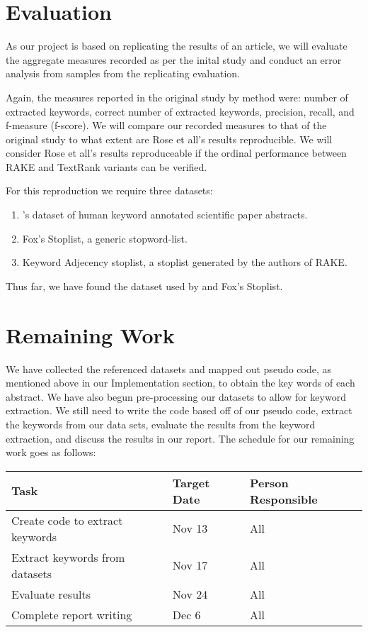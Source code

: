 \documentclass[11pt,a4paper]{article}
\begin{document}
\section{Evaluation}

As our project is based on replicating the results of an article, we will evaluate the aggregate measures recorded as per the inital study and conduct an error analysis from samples from the replicating evaluation. 

Again, the measures reported in the original study by method were: number of extracted keywords, correct number of extracted keywords, precision, recall, and f-measure (f-score).  We will compare our recorded measures to that of the original study to what extent are Rose et all's results reproducible. We will consider Rose et all's results reproduceable if the ordinal performance between RAKE and TextRank variants can be verified. 

For this reproduction we require three datasets:

\begin{enumerate}
\item \citet{hulth-2003-improved}'s dataset of human keyword annotated scientific paper abstracts.
\item Fox's Stoplist, a generic stopword-list. 
\item Keyword Adjecency stoplist, a stoplist generated by the authors of RAKE.
\end{enumerate}   

Thus far, we have found the dataset used by \citet{hulth-2003-improved} and Fox's Stoplist.

\section{Remaining Work}

We have collected the referenced datasets and mapped out pseudo code, as mentioned above in our Implementation section, to obtain the key words of each abstract. We have also begun pre-processing our datasets to allow for keyword extraction. We still need to write the code based off of our pseudo code, extract the keywords from our data sets, evaluate the results from the keyword extraction, and discuss the results in our report. The schedule for our remaining work goes as follows:

\begin{table}[h]
\begin{center}
\begin{tabular}{|p{3.3cm}|p{1.4cm}|p{1.7cm}|}
\hline \bf Task & \bf Target Date & \bf Person  Responsible \\  
\hline
 Create code to extract keywords & Nov 13 & All \\ 
\hline 
 Extract keywords from datasets & Nov 17 & All \\
\hline
 Evaluate results & Nov 24 & All \\
\hline
Complete report writing & Dec 6 & All  \\
\hline   
\end{tabular}
\end{center}
\end{table}
\end{document}
